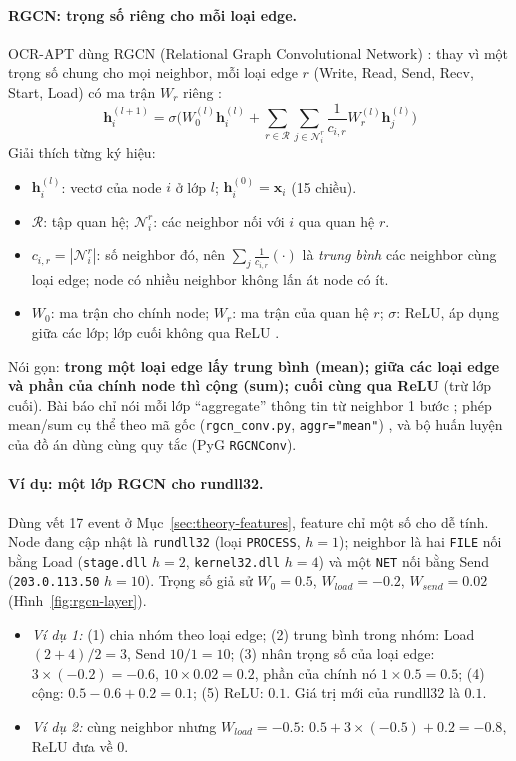 \paragraph{RGCN: trọng số riêng cho mỗi loại edge.}
OCR-APT dùng RGCN (Relational Graph Convolutional Network) \cite{schlichtkrull2018rgcn}: thay vì một trọng số chung cho mọi neighbor, mỗi loại edge $r$ (Write, Read, Send, Recv, Start, Load) có ma trận $W_r$ riêng \cite[§5.1.1]{aly2025ocrapt}:
\[
\mathbf{h}_i^{(l+1)} = \sigma\Big( W_0^{(l)} \mathbf{h}_i^{(l)} + \sum_{r \in \mathcal{R}} \sum_{j \in \mathcal{N}_i^r} \frac{1}{c_{i,r}} W_r^{(l)} \mathbf{h}_j^{(l)} \Big)
\]
Giải thích từng ký hiệu:
\begin{itemize}
    \item $\mathbf{h}_i^{(l)}$: vectơ của node $i$ ở lớp $l$; $\mathbf{h}_i^{(0)} = \mathbf{x}_i$ (15 chiều).
    \item $\mathcal{R}$: tập quan hệ; $\mathcal{N}_i^r$: các neighbor nối với $i$ qua quan hệ $r$.
    \item $c_{i,r} = |\mathcal{N}_i^r|$: số neighbor đó, nên $\sum_{j} \frac{1}{c_{i,r}}(\cdot)$ là \emph{trung bình} các neighbor cùng loại edge; node có nhiều neighbor không lấn át node có ít.
    \item $W_0$: ma trận cho chính node; $W_r$: ma trận của quan hệ $r$; $\sigma$: ReLU, áp dụng giữa các lớp; lớp cuối không qua ReLU \cite{ocrapt_repo}.
\end{itemize}
Nói gọn: \textbf{trong một loại edge lấy trung bình (mean); giữa các loại edge và phần của chính node thì cộng (sum); cuối cùng qua ReLU} (trừ lớp cuối). Bài báo chỉ nói mỗi lớp ``aggregate'' thông tin từ neighbor 1 bước \cite[§5.1.1]{aly2025ocrapt}; phép mean/sum cụ thể theo mã gốc (\texttt{rgcn\_conv.py}, \texttt{aggr="mean"}) \cite{ocrapt_repo}, và bộ huấn luyện của đồ án dùng cùng quy tắc (PyG \texttt{RGCNConv}).

\paragraph{Ví dụ: một lớp RGCN cho rundll32.}
Dùng vết 17 event ở Mục~\ref{sec:theory-features}, feature chỉ một số cho dễ tính. Node đang cập nhật là \texttt{rundll32} (loại \texttt{PROCESS}, $h = 1$); neighbor là hai \texttt{FILE} nối bằng Load (\texttt{stage.dll} $h = 2$, \texttt{kernel32.dll} $h = 4$) và một \texttt{NET} nối bằng Send (\texttt{203.0.113.50} $h = 10$). Trọng số giả sử $W_0 = 0.5$, $W_{load} = -0.2$, $W_{send} = 0.02$ (Hình~\ref{fig:rgcn-layer}).
\begin{itemize}
    \item \emph{Ví dụ 1:} (1) chia nhóm theo loại edge; (2) trung bình trong nhóm: Load $(2 + 4)/2 = 3$, Send $10/1 = 10$; (3) nhân trọng số của loại edge: $3 \times (-0.2) = -0.6$, $10 \times 0.02 = 0.2$, phần của chính nó $1 \times 0.5 = 0.5$; (4) cộng: $0.5 - 0.6 + 0.2 = 0.1$; (5) ReLU: $0.1$. Giá trị mới của rundll32 là $0.1$.
    \item \emph{Ví dụ 2:} cùng neighbor nhưng $W_{load} = -0.5$: $0.5 + 3 \times (-0.5) + 0.2 = -0.8$, ReLU đưa về $0$.
\end{itemize}

